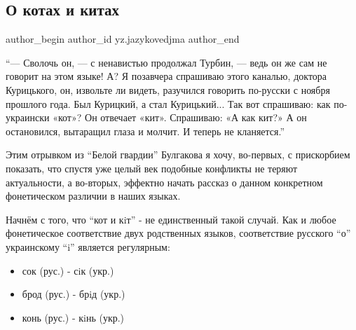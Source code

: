  
 
 
 
 
 
\subsection{О котах и китах}
\label{sec:28_01_2022.yz.jazykovedjma.1.o_kotah_i_kitah}
 
\ifcmt
 author_begin
   author_id yz.jazykovedjma
 author_end
\fi

\begin{zznagolos}
\enquote{— Сволочь он, — с ненавистью продолжал Турбин, — ведь он же сам не говорит на
этом языке! А? Я позавчера спрашиваю этого каналью, доктора Курицького, он,
извольте ли видеть, разучился говорить по-русски с ноября прошлого года. Был
Курицкий, а стал Курицький... Так вот спрашиваю: как по-украински «кот»? Он
отвечает «кит». Спрашиваю: «А как кит?» А он остановился, вытаращил глаза и
молчит. И теперь не кланяется.}	
\end{zznagolos}

Этим отрывком из \enquote{Белой гвардии} Булгакова я хочу, во-первых, с прискорбием
показать, что спустя уже целый век подобные конфликты не теряют актуальности, а
во-вторых, эффектно начать рассказ о данном конкретном фонетическом различии в
наших языках.


Начнём с того, что \enquote{кот и кiт} - не единственный такой случай. Как и любое
фонетическое соответствие двух родственных языков, соответствие русского \enquote{о}
украинскому \enquote{i} является регулярным:

\begin{itemize}
  \item сок (рус.) - сiк (укр.)
  \item брод (рус.) - брiд (укр.)
  \item конь (рус.) - кiнь (укр.)
\end{itemize}

